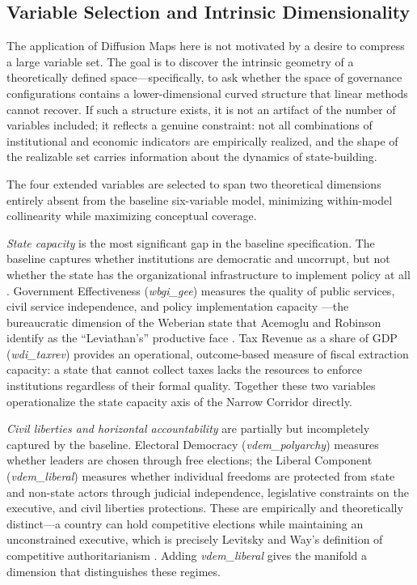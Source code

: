 \documentclass[12pt]{article}
\begin{document}
\subsection{Variable Selection and Intrinsic Dimensionality}
\label{subsec:varselect}

\begin{sloppypar}
    The application of Diffusion Maps here is not motivated by a desire to compress a large variable set. The goal is to discover the intrinsic geometry of a theoretically defined space---specifically, to ask whether the space of governance configurations contains a lower-dimensional curved structure that linear methods cannot recover. If such a structure exists, it is not an artifact of the number of variables included; it reflects a genuine constraint: not all combinations of institutional and economic indicators are empirically realized, and the shape of the realizable set carries information about the dynamics of state-building.
\end{sloppypar}

The four extended variables are selected to span two theoretical dimensions entirely absent from the baseline six-variable model, minimizing within-model collinearity while maximizing conceptual coverage.

\textit{State capacity} is the most significant gap in the baseline specification. The baseline captures whether institutions are democratic and uncorrupt, but not whether the state has the organizational infrastructure to implement policy at all \cite{north1990institutions}. Government Effectiveness (\textit{wbgi\_gee}) measures the quality of public services, civil service independence, and policy implementation capacity \cite{kaufmann2011worldwide}---the bureaucratic dimension of the Weberian state that Acemoglu and Robinson identify as the ``Leviathan's'' productive face \cite{acemoglu2019narrow}. Tax Revenue as a share of GDP (\textit{wdi\_taxrev}) provides an operational, outcome-based measure of fiscal extraction capacity: a state that cannot collect taxes lacks the resources to enforce institutions regardless of their formal quality. Together these two variables operationalize the state capacity axis of the Narrow Corridor directly.

\textit{Civil liberties and horizontal accountability} are partially but incompletely captured by the baseline. Electoral Democracy (\textit{vdem\_polyarchy}) measures whether leaders are chosen through free elections; the Liberal Component (\textit{vdem\_liberal}) measures whether individual freedoms are protected from state and non-state actors through judicial independence, legislative constraints on the executive, and civil liberties protections. These are empirically and theoretically distinct---a country can hold competitive elections while maintaining an unconstrained executive, which is precisely Levitsky and Way's definition of competitive authoritarianism \cite{levitskyway2010}. Adding \textit{vdem\_liberal} gives the manifold a dimension that distinguishes these regimes.
\end{document}
